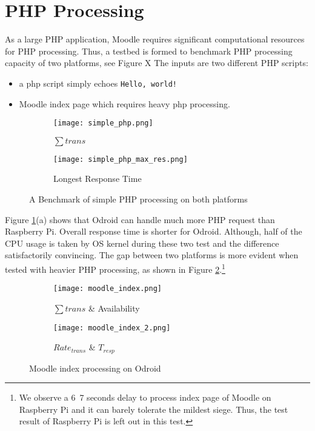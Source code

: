 \section{PHP Processing}
As a large PHP application, Moodle requires significant computational resources for PHP processing. Thus, a testbed is formed to benchmark PHP processing capacity of two platforms, see Figure X
The inputs are two different PHP scripts:
\begin{itemize}
\item a php script simply echoes \texttt{Hello, world!}
\item Moodle index page which requires heavy php processing.
\end{itemize}

\begin{figure}[h]
\centering
\begin{subfigure}{0.45\textwidth}
\centering
\texttt{[image: simple\_php.png]}
\caption{$\sum trans$}
\end{subfigure}
\begin{subfigure}{0.45\textwidth}
\centering
\texttt{[image: simple\_php\_max\_res.png]}
\caption{Longest Response Time}
\end{subfigure}
\caption{A Benchmark of simple PHP processing on both platforms}
\label{simple_php}
\end{figure}

Figure \ref{simple_php}(a) shows that Odroid can handle much more PHP request than Raspberry Pi. Overall response time is shorter for Odroid. Although, half of the CPU usage is taken by OS kernel during these two test and the difference satisfactorily convincing. The gap between two platforms is more evident when tested with heavier PHP processing, as shown in Figure \ref{moodle_php_result}.\footnote{We observe a 6~7 seconds delay to process index page of Moodle on Raspberry Pi and it can barely tolerate the mildest siege. Thus, the test result of Raspberry Pi is left out in this test.}

\begin{figure}[h]
\centering
\begin{subfigure}{0.45\textwidth}
\centering
\texttt{[image: moodle\_index.png]}
\caption{$\sum trans$ \& Availability}
\end{subfigure}
\begin{subfigure}{0.45\textwidth}
\centering
\texttt{[image: moodle\_index\_2.png]}
\caption{$Rate_{trans}$ \& $T_{resp}$}
\end{subfigure}
\caption{Moodle index processing on Odroid}
\label{moodle_php_result}
\end{figure}

